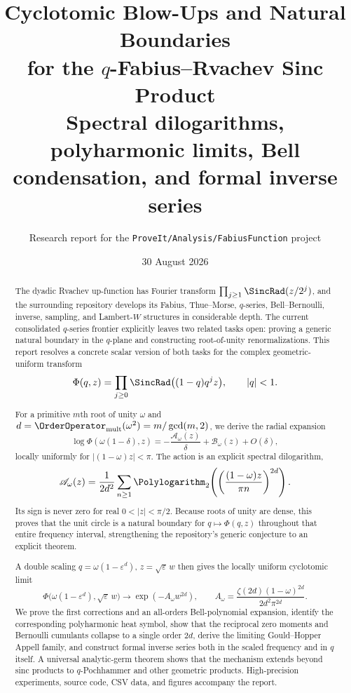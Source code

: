 \documentclass[11pt]{article}
\title{\bfseries Cyclotomic Blow-Ups and Natural Boundaries\\[4pt]
for the $q$-Fabius--Rvachev Sinc Product\\[8pt]
\large Spectral dilogarithms, polyharmonic limits, Bell condensation, and formal inverse series}
\author{Research report for the \texttt{ProveIt/Analysis/FabiusFunction} project}
\date{30 August 2026}
\theoremstyle{definition}
\begin{document}
\maketitle

\begin{abstract}
The dyadic Rvachev up-function has Fourier transform
\(
 \prod_{j\ge 1}\SincRad(z/2^j)
\), and the surrounding repository develops its Fabius, Thue--Morse, $q$-series, Bell--Bernoulli, inverse, sampling, and Lambert-$W$ structures in considerable depth.  The current consolidated $q$-series frontier explicitly leaves two related tasks open: proving a generic natural boundary in the $q$-plane and constructing root-of-unity renormalizations.  This report resolves a concrete scalar version of both tasks for the complex geometric-uniform transform
\[
 \Phi(q,z)=\prod_{j\ge0}\SincRad\bigl((1-q)q^jz\bigr),\qquad |q|<1.
\]

For a primitive $m$th root of unity $\omega$ and
\(d=\OrderOperator_{\mathrm{mult}}(\omega^2)=m/\gcd(m,2)\), we derive the radial expansion
\[
 \log\Phi(\omega(1-\delta),z)
 =-\frac{\mathscr A_\omega(z)}{\delta}+\mathscr B_\omega(z)+O(\delta),
\]
locally uniformly for $|(1-\omega)z|<\pi$.  The action is an explicit spectral dilogarithm,
\[
 \mathscr A_\omega(z)=\frac1{2d^2}
 \sum_{n\ge1}\Polylogarithm_2\!\left(\left(\frac{(1-\omega)z}{\pi n}\right)^{2d}\right).
\]
Its sign is never zero for real $0<|z|<\pi/2$.  Because roots of unity are dense, this proves that the unit circle is a natural boundary for $q\mapsto\Phi(q,z)$ throughout that entire frequency interval, strengthening the repository's generic conjecture to an explicit theorem.

A double scaling
\(q=\omega(1-\varepsilon^d)\), \(z=\sqrt\varepsilon\,w\)
then gives the locally uniform cyclotomic limit
\[
 \Phi\bigl(\omega(1-\varepsilon^d),\sqrt\varepsilon\,w\bigr)
 \longrightarrow \exp(-A_\omega w^{2d}),
 \qquad
 A_\omega=\frac{\zeta(2d)(1-\omega)^{2d}}{2d^2\pi^{2d}}.
\]
 We prove the first corrections and an all-orders Bell-polynomial expansion, identify the corresponding polyharmonic heat symbol, show that the reciprocal zero moments and Bernoulli cumulants collapse to a single order $2d$, derive the limiting Gould--Hopper Appell family, and construct formal inverse series both in the scaled frequency and in $q$ itself.  A universal analytic-germ theorem shows that the mechanism extends beyond sinc products to $q$-Pochhammer and other geometric products.  High-precision experiments, source code, CSV data, and figures accompany the report.
\end{abstract}
\end{document}
